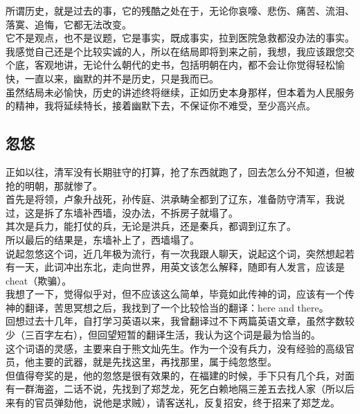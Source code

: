 \begin{multicols}{\theparacolNo}
所谓历史，就是过去的事，它的残酷之处在于，无论你哀嚎、悲伤、痛苦、流泪、落寞、追悔，它都无法改变。\\

它不是观点，也不是议题，它是事实，既成事实，拉到医院急救都没办法的事实。\\

我感觉自己还是个比较实诚的人，所以在结局即将到来之前，我想，我应该跟您交个底，客观地讲，无论什么朝代的史书，包括明朝在内，都不会让你觉得轻松愉快，一直以来，幽默的并不是历史，只是我而已。\\

虽然结局未必愉快，历史的讲述终将继续，正如历史本身那样，但本着为人民服务的精神，我将延续特长，接着幽默下去，不保证你不难受，至少高兴点。\\

\subsection{忽悠}
正如以往，清军没有长期驻守的打算，抢了东西就跑了，回去怎么分不知道，但被抢的明朝，那就惨了。\\

首先是将领，卢象升战死，孙传庭、洪承畴全都到了辽东，准备防守清军，我说过，这是拆了东墙补西墙，没办法，不拆房子就塌了。\\

其次是兵力，能打仗的兵，无论是洪兵，还是秦兵，都调到辽东了。\\

所以最后的结果是，东墙补上了，西墙塌了。\\

说起忽悠这个词，近几年极为流行，有一次我跟人聊天，说起这个词，突然想起若有一天，此词冲出东北，走向世界，用英文该怎么解释，随即有人发言，应该是cheat（欺骗）。\\

我想了一下，觉得似乎对，但不应该这么简单，毕竟如此传神的词，应该有一个传神的翻译，苦思冥想之后，我找到了一个比较恰当的翻译：here and there。\\

回想过去十几年，自打学习英语以来，我曾翻译过不下两篇英语文章，虽然字数较少（三百字左右），但回望短暂的翻译生活，我认为这个词是最为恰当的。\\

这个词语的灵感，主要来自于熊文灿先生。作为一个没有兵力，没有经验的高级官员，他主要的武器，就是先找这里，再找那里，属于纯忽悠型。\\

但值得夸奖的是，他的忽悠是很有效果的，在福建的时候，手下只有几个兵，对面有一群海盗，二话不说，先找到了郑芝龙，死乞白赖地隔三差五去找人家（所以后来有的官员弹劾他，说他是求贼），请客送礼，反复招安，终于招来了郑芝龙。\\


\end{multicols}
